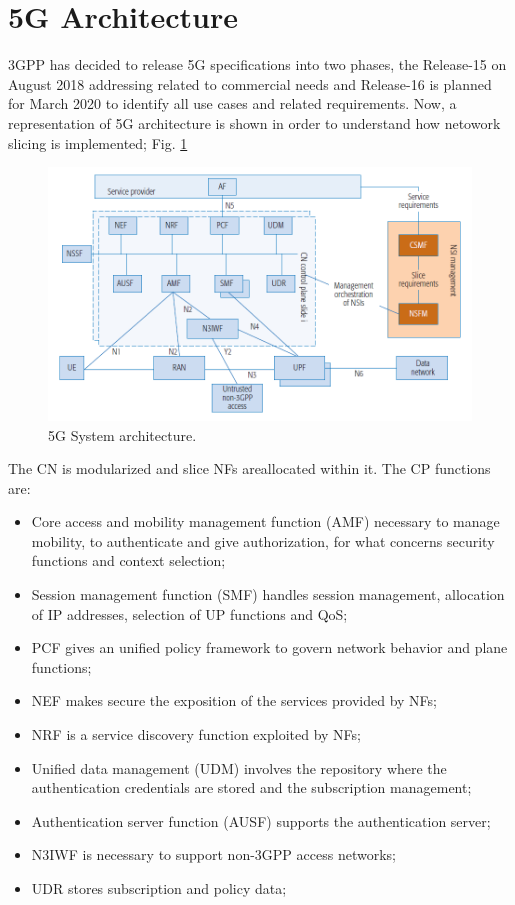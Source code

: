 \documentclass[a4paper,12pt]{report} %
\begin{document}
\section{5G Architecture}
3GPP has decided to release 5G specifications into
two phases, the Release-15 on August 2018 addressing related to commercial
needs and Release-16 is planned for March
2020 to identify all use cases and related requirements. 
Now, a representation of 5G architecture is shown in order to understand how netowork slicing is implemented; Fig. \ref{archite}
\begin{figure}[h]
\centering
\includegraphics[scale=.57]{pics/5g_architecture.PNG}
\caption{5G System architecture. \cite{etsi2018gs} \cite{kaloxylos2018survey}}
\label{archite}
\end{figure}
The CN is modularized and slice NFs areallocated within it. The CP functions are:
\begin{itemize}
\item Core access and mobility management function
(AMF) necessary to manage mobility, to
authenticate and give authorization, for what concerns security
functions and context selection;

\item Session management function (SMF) handles session
management, allocation of IP addresses, selection of UP functions and QoS;

\item \gls{PCF} gives an unified policy framework to govern network behavior and plane functions;

\item \gls{NEF} makes secure the exposition of the services provided by NFs;

\item \gls{NRF} is a service discovery function exploited by NFs;

\item Unified data management (UDM) involves the repository where the authentication
credentials are stored and the subscription management;

\item Authentication server function (AUSF) supports the authentication server;

\item \gls{N3IWF} is necessary to support non-3GPP access networks;

\item \gls{UDR} stores subscription and policy data;
\end{itemize}
\end{document}
